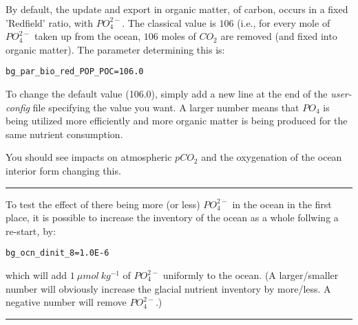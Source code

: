 \noindent By default, the update and export in organic matter, of carbon, occurs in a fixed 'Redfield' ratio, with \(PO^{2-}_{4}\). The classical value is \(106\) (i.e., for every mole of \(PO^{2-}_{4}\) taken up from the ocean, \(106\) moles of \(CO_{2}\) are removed (and fixed into organic matter). The parameter determining this is:
\vspace{-2mm}\small\begin{verbatim}
bg_par_bio_red_POP_POC=106.0
\end{verbatim}\normalsize\vspace{-2mm}
To change the default value (106.0), simply add a new line at the end of the \textit{user-config} file specifying the value you want. A larger number means that \(PO_{4}\) is being utilized more efficiently and more organic matter is being produced for the same nutrient consumption.

You should see impacts on atmospheric \(pCO_{2}\) and the oxygenation of the ocean interior form changing this.

\vspace{1mm}
\noindent\rule{4cm}{0.5pt}
\vspace{2mm}

\noindent To test the effect of there being more (or less) \(PO^{2-}_{4}\) in the ocean in the first place, it is possible to increase the inventory of the ocean as a whole follwing a re-start\textit{, }by:
\vspace{-2mm}\small\begin{verbatim}
bg_ocn_dinit_8=1.0E-6
\end{verbatim}\normalsize\vspace{-2mm}
which will add \(1\:\mu mol\:kg^{-1}\) of \(PO^{2-}_{4}\) uniformly to the ocean. (A larger/smaller number will obviously increase the glacial nutrient inventory by more/less. A negative number will remove \(PO^{2-}_{4}\).)

\vspace{1mm}
\noindent\rule{4cm}{0.5pt}
\vspace{2mm}


